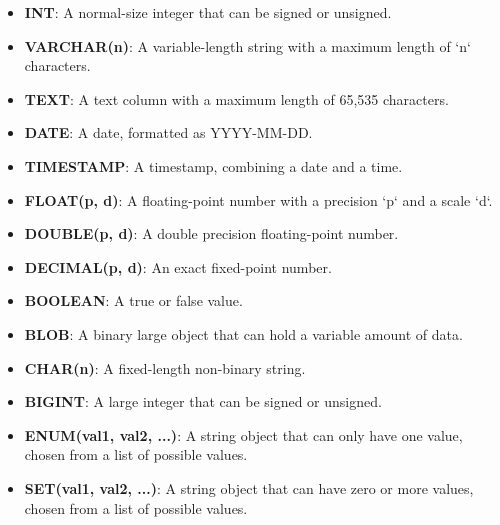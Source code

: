 \begin{itemize}[noitemsep,leftmargin=*]
    \item \textbf{INT}: A normal-size integer that can be signed or unsigned.
    \item \textbf{VARCHAR(n)}: A variable-length string with a maximum length of `n` characters.
    \item \textbf{TEXT}: A text column with a maximum length of 65,535 characters.
    \item \textbf{DATE}: A date, formatted as YYYY-MM-DD.
    \item \textbf{TIMESTAMP}: A timestamp, combining a date and a time.
    \item \textbf{FLOAT(p, d)}: A floating-point number with a precision `p` and a scale `d`.
    \item \textbf{DOUBLE(p, d)}: A double precision floating-point number.
    \item \textbf{DECIMAL(p, d)}: An exact fixed-point number.
    \item \textbf{BOOLEAN}: A true or false value.
    \item \textbf{BLOB}: A binary large object that can hold a variable amount of data.
    \item \textbf{CHAR(n)}: A fixed-length non-binary string.
    \item \textbf{BIGINT}: A large integer that can be signed or unsigned.
    \item \textbf{ENUM(val1, val2, ...)}: A string object that can only have one value, chosen from a list of possible values.
    \item \textbf{SET(val1, val2, ...)}: A string object that can have zero or more values, chosen from a list of possible values.
\end{itemize}

